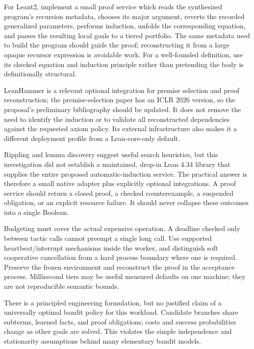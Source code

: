 For Leant2, implement a small proof service which reads the synthesized program's recursion metadata, chooses its major argument, reverts the recorded generalized parameters, performs induction, unfolds the corresponding equation, and passes the resulting local goals to a tiered portfolio. The same metadata used to build the program should guide the proof; reconstructing it from a large opaque recursor expression is avoidable work. For a well-founded definition, use its checked equation and induction principle rather than pretending the body is definitionally structural.

LeanHammer is a relevant optional integration for premise selection and proof reconstruction; the premise-selection paper has an ICLR 2026 version, so the proposal's preliminary bibliography should be updated. It does not remove the need to identify the induction or to validate all reconstructed dependencies against the requested axiom policy. Its external infrastructure also makes it a different deployment profile from a Lean-core-only default.\cite{leanhammer}

Rippling and lemma discovery suggest useful search heuristics, but this investigation did not establish a maintained, drop-in Lean 4.34 library that supplies the entire proposed automatic-induction service. The practical answer is therefore a small native adapter plus explicitly optional integrations. A proof service should return a closed proof, a checked counterexample, a suspended obligation, or an explicit resource failure. It should never collapse these outcomes into a single Boolean.

Budgeting must cover the actual expensive operation. A deadline checked only between tactic calls cannot preempt a single long call. Use supported heartbeat/interrupt mechanisms inside the worker, and distinguish soft cooperative cancellation from a hard process boundary where one is required. Preserve the frozen environment and reconstruct the proof in the acceptance process. Millisecond tiers may be useful measured defaults on one machine; they are not reproducible semantic bounds.


\answer There is a principled engineering formulation, but no justified claim of a universally optimal bandit policy for this workload. Candidate branches share subterms, learned facts, and proof obligations; costs and success probabilities change as other goals are solved. This violates the simple independence and stationarity assumptions behind many elementary bandit models.

